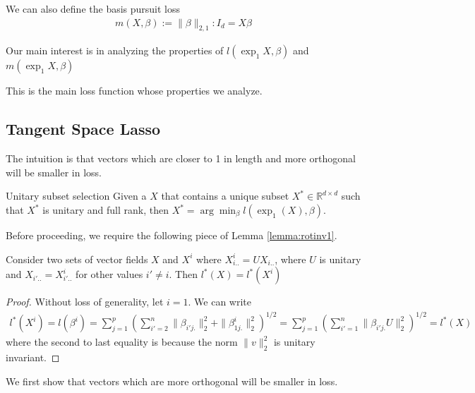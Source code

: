 \documentclass[a4paper,11pt]{article}
\begin{document}
We can also define the basis pursuit loss
\begin{align}
m (X, \beta) := \|\beta\|_{2,1} :  I_d = X\beta
\end{align}

Our main interest is in analyzing the properties of $l(\exp_1 X,  \beta)$ and $m(\exp_1 X,  \beta)$ 

This is the main loss function whose properties we analyze.



\subsection{Tangent Space Lasso}

The intuition is that vectors which are closer to 1 in length and more orthogonal will be smaller in loss.

\begin{proposition}{Unitary subset selection}
Given a $X$ that contains a unique subset $X^* \in \mathbb R^{d \times d} $ such that $X^*$ is unitary and full rank, then $X^* = \arg \min_\beta l(\exp_1(X),\beta)$.
\end{proposition}


Before proceeding, we require the following piece of Lemma \ref{lemma:rotinv1}. 
 \begin{proposition}
 \label{prop:unitarybasis}
Consider two sets of vector fields $X$ and $X^i$ where $X_{i..}^i = U X_{i..} $, where $U$ is unitary and $X_{i'..} = X_{i'..}^i$ for other values $i' \neq i$.
Then $l^*(X) = l^*(X^i)$
\end{proposition}

\begin{proof}
Without loss of generality, let $i = 1$.
We can write 
\begin{eqnarray}
l^*(X^i) = l(\beta^i) = \sum_{j = 1}^p (\sum_{i'=2}^n \| \beta_{i'j.} \|_2^2 +  \|  \beta_{1j.}^i \|_2^2 )^{1/2}=  \sum_{j = 1}^p (\sum_{i'=1}^n \| \beta_{i'j.} U \|_2^2)^{1/2} = l^*(X)
\end{eqnarray}
where the second to last equality is because the norm $\|v\|_2^2 $ is unitary invariant.
\end{proof}



We first show that vectors which are more orthogonal will be smaller in loss.
\end{document}
